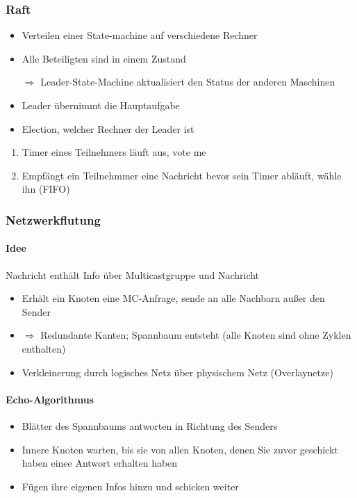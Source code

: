 \documentclass{scrartcl}
\begin{document}

\subsubsection{Raft} \label{raft}
\begin{itemize}
\item Verteilen einer State-machine auf verschiedene Rechner
\item Alle Beteiligten sind in einem Zustand
\item[$\Rightarrow$] Leader-State-Machine aktualisiert den Status der anderen Maschinen
\item Leader übernimmt die Hauptaufgabe
\item Election, welcher Rechner der Leader ist
\end{itemize}
\begin{enumerate}
\item Timer eines Teilnehmers läuft aus, vote me
\item Empfängt ein Teilnehmmer eine Nachricht bevor sein Timer abläuft, wähle ihn (FIFO)
\end{enumerate}


\subsubsection{Netzwerkflutung} \label{echo}
\paragraph{Idee} Nachricht enthält Info über Multicastgruppe und Nachricht
\begin{itemize}
\item Erhält ein Knoten eine MC-Anfrage, sende an alle Nachbarn außer den Sender
\item $\Rightarrow$ Redundante Kanten; Spannbaum entsteht (alle Knoten sind ohne Zyklen enthalten)
\item Verkleinerung durch logisches Netz über physischem Netz (Overlaynetze)
\end{itemize}

\paragraph{Echo-Algorithmus} 
\begin{itemize}
\item Blätter des Spannbaums antworten in Richtung des Senders
\item Innere Knoten warten, bis sie von allen Knoten, denen Sie zuvor geschickt haben einee Antwort erhalten haben
\item Fügen ihre eigenen Infos hinzu und schicken weiter
\end{itemize}
\end{document}
